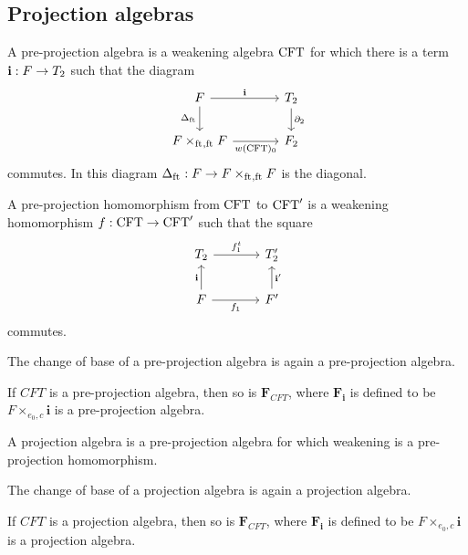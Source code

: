 \subsection{Projection algebras}
\begin{defn}
A pre-projection algebra is a weakening algebra $\mathrm{CFT}$ for which there is a term
$\mathbf{i}:F\to T_2$ such that the diagram
\begin{equation*}
\begin{tikzcd}[column sep=large]
\stesysf \ar{r}{\mathbf{i}} \ar{d}[swap]{\Delta_{\eft}} & \stesyst_2 \ar{d}{\ebd[2]}\\
\pullback{\stesysf}{\stesysf}{\eft}{\eft} \ar{r}[swap]{w(\stesys)_0} & \stesysf_2
\end{tikzcd}
\end{equation*}
commutes. In this diagram $\Delta_{\eft}:\stesysf\to \pullback{\stesysf}{\stesysf}{\eft}{\eft}$ is the diagonal.
\end{defn}

\begin{defn}
A pre-projection homomorphism from $\mathrm{CFT}$ to $\mathrm{CFT}'$ is a weakening homomorphism
$f:\mathrm{CFT}\to \mathrm{CFT}'$ such that the square
\begin{equation*}
\begin{tikzcd}[column sep=large]
\stesyst_2
  \ar{r}{f^t_1}
  &
\stesyst_2'
  \\
\stesysf \ar{r}[swap]{f_1}
  \ar{u}{\mathbf{i}}
  &
\stesysf'
  \ar{u}[swap]{\mathbf{i}'}
\end{tikzcd}
\end{equation*}
commutes.
\end{defn}

\begin{lem}
The change of base of a pre-projection algebra is again a pre-projection algebra.
\end{lem}

\begin{lem}
If $CFT$ is a pre-projection algebra, then so is $\mathbf{F}_{CFT}$, where
$\mathbf{F}_{\mathbf{i}}$ is defined to be $F\times_{e_0,c}\mathbf{i}$ is
a pre-projection algebra.
\end{lem}

\begin{defn}
A projection algebra is a pre-projection algebra for which weakening is a
pre-projection homomorphism.
\end{defn}

\begin{cor}
The change of base of a projection algebra is again a projection algebra.
\end{cor}

\begin{cor}
If $CFT$ is a projection algebra, then so is $\mathbf{F}_{CFT}$, where
$\mathbf{F}_{\mathbf{i}}$ is defined to be $F\times_{e_0,c}\mathbf{i}$ is
a projection algebra.
\end{cor}
